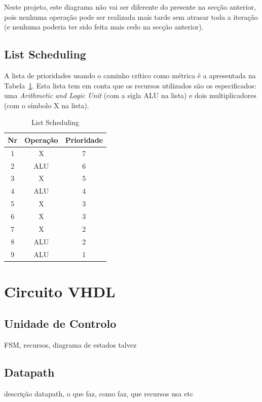 \documentclass{article} %
\begin{document}
			\noindent Neste projeto, este diagrama não vai ser diferente do presente na secção anterior, pois nenhuma operação pode ser realizada mais tarde sem atrasar toda a iteração (e nenhuma poderia ter sido feita mais cedo na secção anterior).

		\subsection{List Scheduling}
		
		A lista de prioridades usando o caminho crítico como métrica é a apresentada na Tabela~\ref{tab:Lsched}. Esta lista tem em conta que os recursos utilizados são os especificados: uma \emph{Arithmetic and Logic Unit} (com a sigla ALU na lista) e dois multiplicadores (com o símbolo X na lista).

		\begin{table}[htbp]
			\caption{List Scheduling}
			\begin{center}
				\begin{tabular}{|c||c||c|}
					\hline
					Nr & Operação & Prioridade \\
					\hline
					1 & X & 7 \\
					\hline
					2 & ALU & 6 \\
					\hline
					3 & X & 5 \\
					\hline
					4 & ALU & 4 \\
					\hline
					5 & X & 3 \\
					\hline
					6 & X & 3 \\
					\hline
					7 & X & 2 \\
					\hline
					8 & ALU & 2 \\
					\hline
					9 & ALU & 1 \\
					\hline
				\end{tabular}
			\end{center}
			\label{tab:Lsched}
		\end{table}

	\section{Circuito VHDL}
		\subsection{Unidade de Controlo}
			FSM, recursos, diagrama de estados talvez

		\subsection{Datapath}
			descrição datapath, o que faz, como faz, que recursos usa etc
\end{document}
